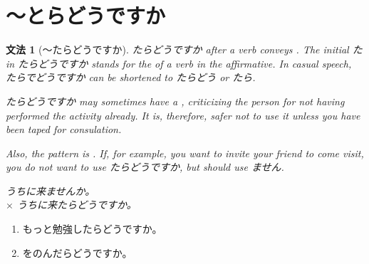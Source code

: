 \documentclass[notoc,notitlepage]{tufte-book}
\newtheorem{grammar}{文法}[section]
\begin{document}

\section{〜とらどうですか}%
\label{sec:_toradoudesuka}

\begin{grammar}[〜たらどうですか]
\label{grammar:_taradoudesuka}
  たらどうですか after a verb conveys . The initial た in たらどうですか stands for the  of a verb in the affirmative. In casual speech, たらでどうですか can be shortened to たらどう or たら.

  たらどうですか may sometimes have a , criticizing the person for not having performed the activity already. It is, therefore, safer not to use it unless you have been taped for consulation.

  Also, the pattern is . If, for example, you want to invite your friend to come visit, you do not want to use たらどうですか, but should use ません.
  \begin{center}
    うちに来ませんか。\\
    $\times$ うちに来たらどうですか。
  \end{center}
\end{grammar}

\begin{eg}
  \begin{enumerate}
    \item もっと勉強したらどうですか。
    \item {}をのんだらどうですか。
  \end{enumerate}
\end{eg}
\end{document}
